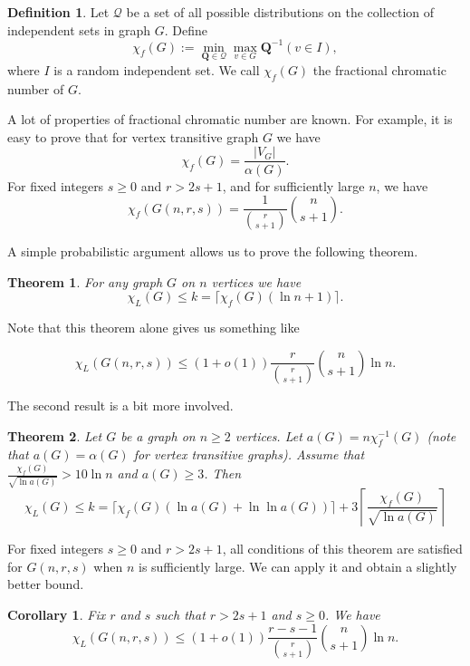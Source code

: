 \documentclass[12pt]{article}
\newtheorem{theorem}{Theorem}
\newtheorem{corollary}{Corollary}[section]
\theoremstyle{remark}
\theoremstyle{definition}
\newtheorem{definition}{Definition}[section]
\newcommand{\skob}[1]{\left(#1\right)}
\begin{document}
\begin{definition}
    Let $\mathcal{Q}$ be a set of all possible distributions on the collection of independent sets in graph $G$. Define 
    $$
        \chi_f(G) := \min_{\mathbf{Q} \in \mathcal{Q}} \max_{v \in G} \mathbf{Q}^{-1}(v \in I),
    $$
    where $I$ is a random independent set. We call $\chi_f(G)$ the fractional chromatic number of $G$.
\end{definition}

A lot of properties of fractional chromatic number are known. For example, it is easy to prove that for vertex transitive graph $G$ we have
$$
    \chi_f(G) = \frac{|V_G|}{\alpha(G)}.
$$
For fixed integers $s \geq 0$ and $r > 2s+1$, and for sufficiently large $n$, we have 
$$
\chi_f(G(n,r,s)) = \frac{1}{\binom{r}{s+1}}\binom{n}{s+1}.
$$

A simple probabilistic argument allows us to prove the following theorem.

\begin{theorem}
    \label{UB1}
    For any graph $G$ on $n$ vertices we have 
    $$
        \chi_L(G) \leq k = \lceil\chi_f(G)(\ln n + 1)\rceil.
    $$
\end{theorem}

Note that this theorem alone gives us something like 

$$
    \chi_L(G(n,r,s)) \leq (1+o(1))\frac{r}{\binom{r}{s+1}}\binom{n}{s+1}\ln n.
$$

The second result is a bit more involved.

\begin{theorem}
    \label{UB2}
    Let $G$ be a graph on $n \geq 2$ vertices. Let $a(G) = n\chi^{-1}_f(G)$ (note that $a(G) = \alpha(G)$ for vertex transitive graphs). Assume that $\frac{\chi_f(G)}{\sqrt{\ln a(G)}} > 10\ln n$ and $a(G) \geq 3$. Then
    $$
        \chi_L(G) \leq k = \lceil\chi_f(G)\skob{\ln a(G) + \ln \ln a(G)}\rceil + 3\left\lceil\frac{\chi_f(G)}{\sqrt{\ln a(G)}}\right\rceil
    $$
\end{theorem}

For fixed integers $s \geq 0$ and $r > 2s+1$, all conditions of this theorem are satisfied for $G(n,r,s)$ when $n$ is sufficiently large. We can apply it and obtain a slightly better bound.

\begin{corollary}    
    Fix $r$ and $s$ such that $r > 2s+1$ and $s \geq 0$. We have 
    $$
        \chi_L(G(n,r,s)) \leq (1+o(1))\frac{r-s-1}{\binom{r}{s+1}}\binom{n}{s+1}\ln n.
    $$
\end{corollary}
\end{document}
